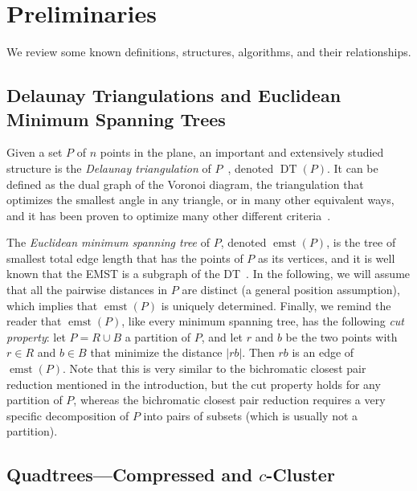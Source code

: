\documentclass[11pt]{paper}
\DeclareMathOperator {\emst}{emst}
\DeclareMathOperator {\DT}{DT}
\begin{document}
\section {Preliminaries} \label {sec:prelim}

  We review some known definitions, structures, 
  algorithms, and their relationships.


  \subsection {Delaunay Triangulations and Euclidean Minimum Spanning Trees}

    Given a set $P$ of $n$ points in the plane, an important and extensively
    studied structure is the \emph {Delaunay triangulation} of $P$~\cite
    {deBergChvKrOv08,BoissonnatYv98,d-slsv-34,PreparataSh85,ShamosHo75}, 
    denoted $\DT(P)$.  It can be defined as the dual graph of the
    Voronoi diagram, the triangulation that optimizes the smallest angle in any
    triangle, or in many other equivalent ways, and it has been proven to
    optimize many other different criteria~\cite {m-pdt-97}.

    The \emph {Euclidean minimum spanning tree} of $P$, denoted $\emst(P)$, 
    is the tree of smallest total edge length that has the
    points of $P$ as its vertices, and it is well known that the EMST is a
    subgraph of the DT~\cite[Theorem~7]{ShamosHo75}.
    In the following, we will assume that all the pairwise distances in
    $P$ are distinct (a general position assumption), which implies that
    $\emst(P)$ is uniquely determined. Finally, we remind the reader that
    $\emst(P)$, like every minimum spanning tree, has 
    the following \emph{cut property}: let $P = R \cup B$
    a partition of $P$, and let $r$ and $b$ be the two points with $r \in R$ and
    $b \in B$ that minimize  the distance $|rb|$. Then $rb$ is an edge
    of $\emst(P)$. Note that this is very similar to the bichromatic closest 
    pair reduction mentioned in the introduction, but the cut property
    holds for any partition of $P$, whereas the bichromatic closest
    pair reduction requires a very specific decomposition of $P$ into pairs
    of subsets (which is usually not a partition).

 \subsection {Quadtrees---Compressed and $c$-Cluster}
  \label {sec:cqt&cqt}
\end{document}
